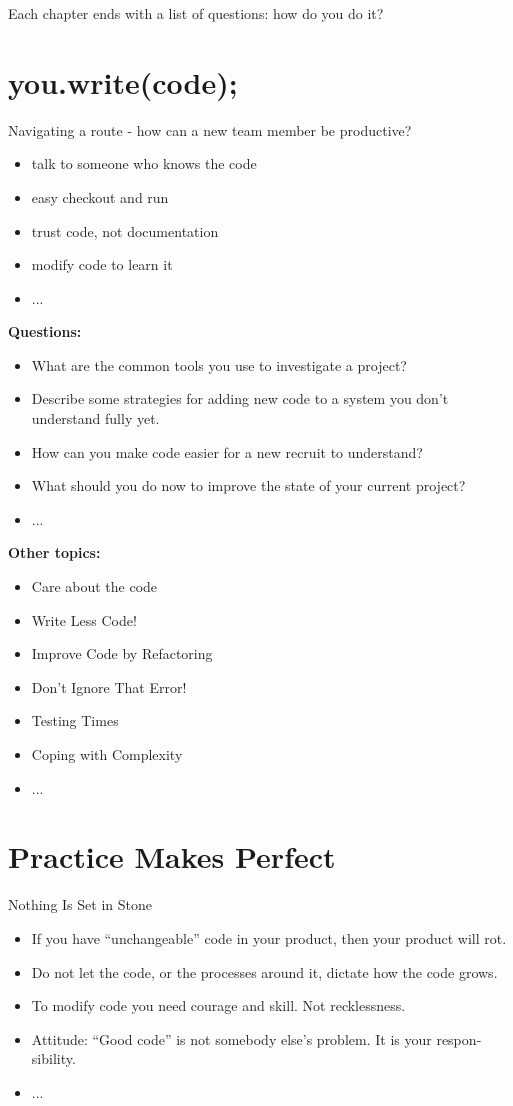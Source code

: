 \documentclass{mypresentation}
\begin{document}
\bigskip
Each chapter ends with a list of questions: how do you do it?
\newpage


\section{you.write(code);}
Navigating a route - how can a new team member be productive?
\begin{itemize}
\item talk to someone who knows the code
\item easy checkout and run
\item trust code, not documentation
\item modify code to learn it
\item ...
\end{itemize}
\newpage


\textbf{Questions:}
\begin{itemize}
\item What are the common tools you use to investigate a project?
\item Describe some strategies for adding new code to a system you don't understand fully yet.
\item How can you make code easier for a new recruit to understand? 
\item What should you do now to improve the state of your current project?
\item ...
\end{itemize}
\newpage


\textbf{Other topics:}
\begin{itemize}
\item Care about the code
\item Write Less Code!
\item Improve Code by Refactoring
\item Don't Ignore That Error!
\item Testing Times
\item Coping with Complexity
\item ...
\end{itemize}
\newpage


\section{Practice Makes Perfect}
Nothing Is Set in Stone
\begin{itemize}
\item If you have “unchangeable” code in your product, then your product will rot.
\item Do not let the code, or the processes around it, dictate how the code grows.
\item To modify code you need courage and skill. Not recklessness.
\item Attitude: “Good code” is not somebody else’s problem. It is your respon‐ sibility.
\item ...
\end{itemize}
\newpage
\end{document}
